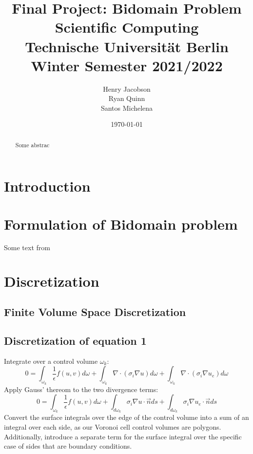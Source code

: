 \documentclass{finalproject}
\title{Final Project: Bidomain Problem \\ \large{Scientific Computing \\ Technische Universität Berlin \\ Winter Semester 2021/2022}}
\author{Henry Jacobson\\Ryan Quinn\\Santos Michelena}
\date{\today}
\begin{document}
\maketitle

\begin{abstract} %
Some abstrac
\end{abstract}

\section{Introduction} %
\section{Formulation of Bidomain problem}
Some text from \cite{eth_bou}
\section{Discretization}
\subsection{Finite Volume Space Discretization}
\subsection{Discretization of equation 1}
Integrate over a control volume $\omega_k$:
\begin{equation}
   0=\int_{\omega_k}\frac{1}{\epsilon}f(u,v)d\omega +
       \int_{\omega_k}\nabla \cdot (\sigma_i \nabla u)d\omega + \int_{\omega_k}\nabla \cdot (\sigma_i \nabla u_e)d\omega
\end{equation}
Apply Gauss' thereom to the two divergence terms:
\begin{equation}
    0=\int_{\omega_k}\frac{1}{\epsilon}f(u,v)d\omega +
    \int_{d\omega_k}\sigma_i \nabla u \cdot \overrightarrow{n}ds +
    \int_{d\omega_k}\sigma_i \nabla u_e \cdot \overrightarrow{n}ds
\end{equation}
Convert the surface integrals over the edge of the control volume into a sum of an integral over each side, as our Voronoi cell control volumes are polygons. Additionally, introduce a separate term for the surface integral over the specific case of sides that are boundary conditions.
\end{document}
